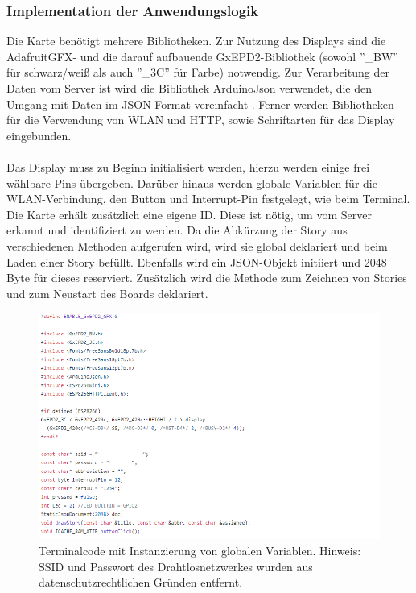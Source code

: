 \documentclass[12pt,titlepage]{scrartcl}
\begin{document}
			\subsubsection{Implementation der Anwendungslogik}
			Die Karte benötigt mehrere Bibliotheken. Zur Nutzung des Displays sind die AdafruitGFX- und die darauf aufbauende GxEPD2-Bibliothek (sowohl ''\_BW'' für schwarz/weiß als auch ''\_3C'' für Farbe) notwendig. Zur Verarbeitung der Daten vom Server ist wird die Bibliothek ArduinoJson verwendet, die den Umgang mit Daten im JSON-Format vereinfacht \cite{arduinojson}. Ferner werden Bibliotheken für die Verwendung von WLAN und HTTP, sowie Schriftarten für das Display eingebunden. \\ \\
			Das Display muss zu Beginn initialisiert werden, hierzu werden einige frei wählbare Pins übergeben. Darüber hinaus werden globale Variablen für die WLAN-Verbindung, den Button und Interrupt-Pin festgelegt, wie beim Terminal. Die Karte erhält zusätzlich eine eigene ID. Diese ist nötig, um vom Server erkannt und identifiziert zu werden. Da die Abkürzung der Story aus verschiedenen Methoden aufgerufen wird, wird sie global deklariert und beim Laden einer Story befüllt. Ebenfalls wird ein JSON-Objekt initiiert und 2048 Byte für dieses reserviert. Zusätzlich wird die Methode zum Zeichnen von Stories und zum Neustart des Boards deklariert. \\
		\begin{figure}[H] 
  			\centering
    		\includegraphics[height=0.5\textheight]{storyHead}
  			\caption{Terminalcode mit Instanzierung von globalen Variablen. Hinweis: SSID und Passwort des Drahtlosnetzwerkes wurden aus datenschutzrechtlichen Gründen entfernt.}
  			\label{fig:storyHead}
		\end{figure}
\end{document}
